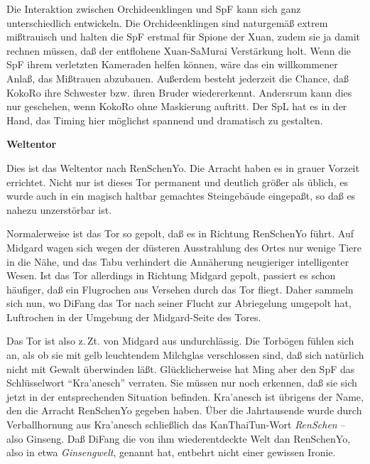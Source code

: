 \documentclass[
a4paper,
twoside,
DIV=calc,
BCOR=4mm,
fontsize=9pt,
twocolumn=on,
titlepage=on,
parskip=half
]{scrartcl}
\begin{document}
Die Interaktion zwischen Orchideenklingen und SpF kann sich ganz
unterschiedlich entwickeln. Die Orchideenklingen sind naturgemäß
extrem mißtrauisch und halten die SpF erstmal für Spione der Xuan,
zudem sie ja damit rechnen müssen, daß der entflohene Xuan-SaMurai
Verstärkung holt. Wenn die SpF ihrem verletzten Kameraden helfen
können, wäre das ein willkommener Anlaß, das Mißtrauen
abzubauen. Außerdem besteht jederzeit die Chance, daß KokoRo ihre
Schwester bzw. ihren Bruder wiedererkennt. Andersrum kann dies nur
geschehen, wenn KokoRo ohne Maskierung auftritt. Der SpL hat es in der
Hand, das Timing hier möglichst spannend und dramatisch zu gestalten.

\textbf{ Weltentor}


Dies ist das Weltentor nach RenSchenYo. Die Arracht haben es in grauer
Vorzeit errichtet. Nicht nur ist dieses Tor permanent und deutlich
größer als üblich, es wurde auch in ein magisch haltbar gemachtes
Steingebäude eingepaßt, so daß es nahezu unzerstörbar ist.

Normalerweise ist das Tor so gepolt, daß es in Richtung RenSchenYo
führt. Auf Midgard wagen sich wegen der düsteren Ausstrahlung des
Ortes nur wenige Tiere in die Nähe, und das Tabu verhindert die
Annäherung neugieriger intelligenter Wesen. Ist das Tor allerdings in
Richtung Midgard gepolt, passiert es schon häufiger, daß ein
Flugrochen aus Versehen durch das Tor fliegt. Daher sammeln sich nun,
wo DiFang das Tor nach seiner Flucht zur Abriegelung umgepolt hat,
Luftrochen in der Umgebung der Midgard-Seite des Tores.

Das Tor ist also z.\,Zt. von Midgard aus undurchlässig. Die Torbögen
fühlen sich an, als ob sie mit gelb leuchtendem Milchglas verschlossen
sind, daß sich natürlich nicht mit Gewalt überwinden
läßt. Glücklicherweise hat Ming aber den SpF das Schlüsselwort
"`Kra'anesch"' verraten. Sie müssen nur noch erkennen, daß sie sich
jetzt in der entsprechenden Situation befinden. Kra'anesch ist
übrigens der Name, den die Arracht RenSchenYo gegeben haben. Über die
Jahrtausende wurde durch Verballhornung aus Kra'anesch schließlich das
KanThaiTun-Wort \emph{RenSchen} -- also Ginseng. Daß DiFang die von
ihm wiederentdeckte Welt dan RenSchenYo, also in etwa
\emph{Ginsengwelt}, genannt hat, entbehrt nicht einer gewissen Ironie.
\end{document}
